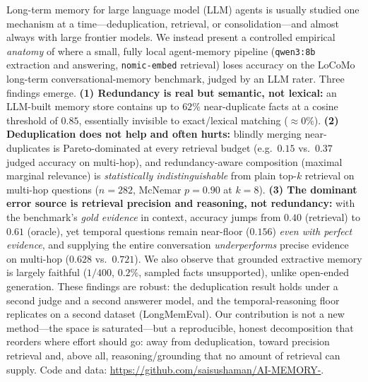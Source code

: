Long-term memory for large language model (LLM) agents is usually studied one
mechanism at a time---deduplication, retrieval, or consolidation---and almost
always with large frontier models. We instead present a controlled empirical
\emph{anatomy} of where a small, fully local agent-memory pipeline
(\texttt{qwen3:8b} extraction and answering, \texttt{nomic-embed} retrieval)
loses accuracy on the LoCoMo long-term conversational-memory benchmark, judged
by an LLM rater. Three findings emerge. \textbf{(1) Redundancy is real but
semantic, not lexical:} an LLM-built memory store contains up to $62\%$
near-duplicate facts at a cosine threshold of $0.85$, essentially invisible to
exact/lexical matching ($\approx\!0\%$). \textbf{(2) Deduplication does not
help and often hurts:} blindly merging near-duplicates is Pareto-dominated at
every retrieval budget (e.g.\ $0.15$ vs.\ $0.37$ judged accuracy on multi-hop),
and redundancy-aware composition (maximal marginal relevance) is
\emph{statistically indistinguishable} from plain top-$k$ retrieval on multi-hop
questions ($n{=}282$, McNemar $p{=}0.90$ at $k{=}8$). \textbf{(3) The dominant
error source is retrieval precision and reasoning, not redundancy:} with the
benchmark's \emph{gold evidence} in context, accuracy jumps from $0.40$
(retrieval) to $0.61$ (oracle), yet temporal questions remain near-floor
($0.156$) \emph{even with perfect evidence}, and supplying the entire
conversation \emph{underperforms} precise evidence on multi-hop
($0.628$ vs.\ $0.721$). We also observe that grounded extractive memory is
largely faithful ($1/400$, $0.2\%$, sampled facts unsupported), unlike open-ended
generation. These findings are robust: the deduplication result holds under a
second judge and a second answerer model, and the temporal-reasoning floor
replicates on a second dataset (LongMemEval). Our contribution is not a new
method---the space is
saturated---but a reproducible, honest decomposition that reorders where effort
should go: away from deduplication, toward precision retrieval and, above all,
reasoning/grounding that no amount of retrieval can supply. Code and data:
\url{https://github.com/saisushaman/AI-MEMORY-}.
